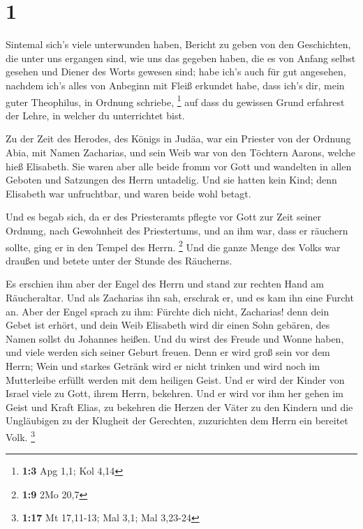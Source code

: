 \hypertarget{section}{%
\section{1}\label{section}}

 Sintemal sich's viele unterwunden haben, Bericht zu geben
von den Geschichten, die unter uns ergangen sind,  wie uns
das gegeben haben, die es von Anfang selbst gesehen und Diener des Worts
gewesen sind;  habe ich's auch für gut angesehen, nachdem
ich's alles von Anbeginn mit Fleiß erkundet habe, dass ich's dir, mein
guter Theophilus, in Ordnung schriebe, \footnote{\textbf{1:3} Apg 1,1;
  Kol 4,14}  auf dass du gewissen Grund erfahrest der Lehre,
in welcher du unterrichtet bist.

 Zu der Zeit des Herodes, des Königs in Judäa, war ein
Priester von der Ordnung Abia, mit Namen Zacharias, und sein Weib war
von den Töchtern Aarons, welche hieß Elisabeth.  Sie waren
aber alle beide fromm vor Gott und wandelten in allen Geboten und
Satzungen des Herrn untadelig.  Und sie hatten kein Kind;
denn Elisabeth war unfruchtbar, und waren beide wohl betagt.

 Und es begab sich, da er des Priesteramts pflegte vor Gott
zur Zeit seiner Ordnung,  nach Gewohnheit des Priestertums,
und an ihm war, dass er räuchern sollte, ging er in den Tempel des
Herrn. \footnote{\textbf{1:9} 2Mo 20,7}  Und die ganze
Menge des Volks war draußen und betete unter der Stunde des Räucherns.

 Es erschien ihm aber der Engel des Herrn und stand zur
rechten Hand am Räucheraltar.  Und als Zacharias ihn sah,
erschrak er, und es kam ihn eine Furcht an.  Aber der Engel
sprach zu ihm: Fürchte dich nicht, Zacharias! denn dein Gebet ist
erhört, und dein Weib Elisabeth wird dir einen Sohn gebären, des Namen
sollst du Johannes heißen.  Und du wirst des Freude und
Wonne haben, und viele werden sich seiner Geburt freuen. 
Denn er wird groß sein vor dem Herrn; Wein und starkes Getränk wird er
nicht trinken und wird noch im Mutterleibe erfüllt werden mit dem
heiligen Geist.  Und er wird der Kinder von Israel viele zu
Gott, ihrem Herrn, bekehren.  Und er wird vor ihm her gehen
im Geist und Kraft Elias, zu bekehren die Herzen der Väter zu den
Kindern und die Ungläubigen zu der Klugheit der Gerechten, zuzurichten
dem Herrn ein bereitet Volk. \footnote{\textbf{1:17} Mt 17,11-13; Mal
  3,1; Mal 3,23-24}

